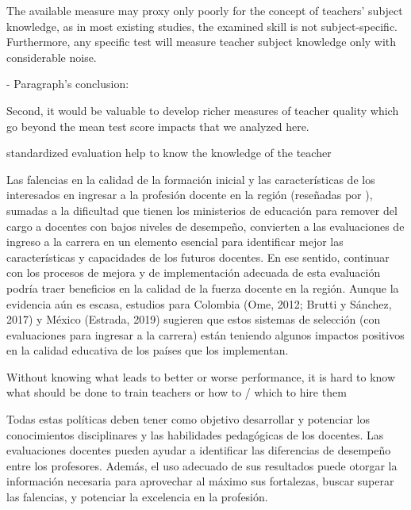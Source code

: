 The available measure may proxy only poorly for the concept of teachers' subject knowledge, as in most existing studies, the examined skill is not subject-specific. Furthermore, any specific test will measure teacher subject knowledge only with considerable noise. \citep{Metzler_et_al_2012}



- Paragraph's conclusion: 

Second, it would be valuable to develop richer measures of teacher quality which go beyond the mean test score impacts that we analyzed here. \citep{Chetty_et_al_2014a}

standardized evaluation help to know the knowledge of the teacher

\citep{Hincapie_et_al_2020}
Las falencias en la calidad de la formación inicial y las características de los interesados
en ingresar a la profesión docente en la región (reseñadas por \citep{Elacqua_et_al_2018}), sumadas a la dificultad que tienen los ministerios de educación para remover del cargo a docentes con bajos niveles de desempeño, convierten a las evaluaciones de ingreso a la carrera en un elemento esencial para identificar mejor las características y capacidades de los futuros docentes. En ese sentido, continuar con los procesos de mejora y de implementación adecuada de esta evaluación podría traer beneficios en la calidad de la fuerza docente en la región. Aunque la evidencia aún es escasa, estudios para Colombia (Ome, 2012; Brutti y Sánchez, 2017) y México (Estrada, 2019) sugieren que estos sistemas de selección (con evaluaciones para ingresar a la carrera) están teniendo algunos impactos positivos en la calidad educativa de los países que los implementan.



Without knowing what leads to better or worse performance, it is hard to know what should be done to train teachers or how to / which to hire them \citep{Hanushek_et_al_2012}







Todas estas políticas deben tener como objetivo desarrollar y potenciar los conocimientos disciplinares y las habilidades pedagógicas de los docentes. Las evaluaciones docentes pueden ayudar a identificar las diferencias de desempeño entre los profesores. Además, el uso adecuado de sus resultados puede otorgar la información necesaria para aprovechar al máximo sus fortalezas, buscar superar las falencias, y potenciar la excelencia en la profesión. \citep{Hincapie_et_al_2020}




